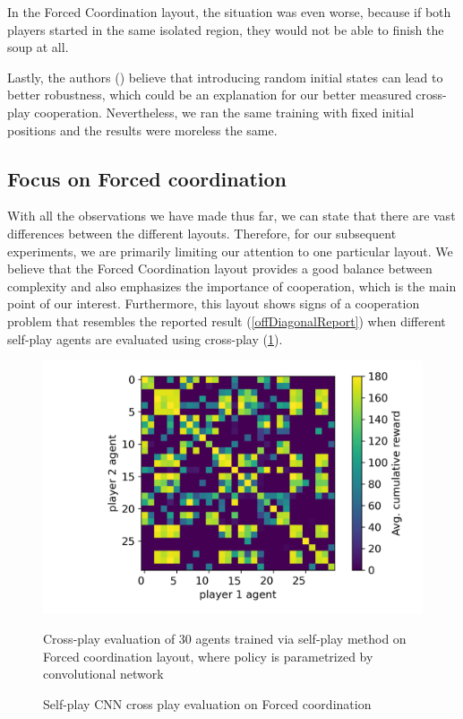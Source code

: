 In the Forced Coordination layout, the situation was even worse, because if both players started in the same isolated region, they would not be able to finish the soup at all.

Lastly, the authors (\cite{knott2021evaluating}) believe that introducing random initial states can lead to better robustness, which could be an explanation for our better measured cross-play cooperation.
Nevertheless, we ran the same training with fixed initial positions and the results were moreless the same.

\subsection{Focus on Forced coordination}
With all the observations we have made thus far, we can state that there are vast differences between the different layouts. 
Therefore, for our subsequent experiments, we are primarily limiting our attention to one particular layout.
We believe that the Forced Coordination layout provides a good balance between complexity and also emphasizes the importance of cooperation, which is the main point of our interest.
Furthermore, this layout shows signs of a cooperation problem that resembles the reported result (\ref{offDiagonalReport}) when different self-play agents are evaluated using cross-play (\ref{ForcedCoordinationCNNSPCrossPlay}).

\begin{figure}[!ht]
  \centering
  \includegraphics*[width=14cm]{../img/Forced_coordination_CNN_SP_CrossPlay.png}
  \caption{Self-play CNN cross play evaluation on Forced coordination}
  \label{ForcedCoordinationCNNSPCrossPlay}
  \medskip
  \small 
  Cross-play evaluation of 30 agents trained via self-play method on Forced coordination layout, where policy is parametrized by convolutional network

\end{figure}